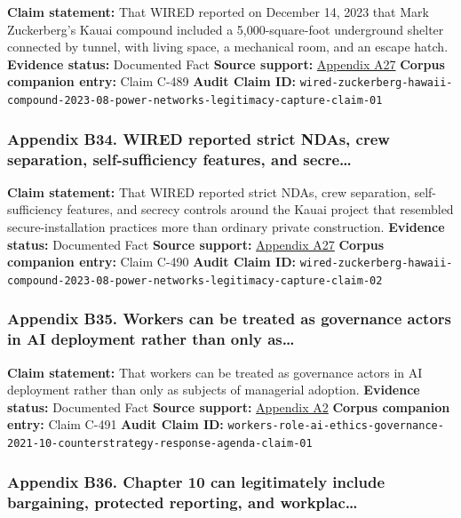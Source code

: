 \documentclass[
  american,
  11pt,
  letterpaper,
]{article}
\begin{document}
\textbf{Claim statement:} That WIRED reported on December 14, 2023 that
Mark Zuckerberg's Kauai compound included a 5,000-square-foot
underground shelter connected by tunnel, with living space, a mechanical
room, and an escape hatch. \textbf{Evidence status:} Documented Fact
\textbf{Source support:}
\hyperref[ch-10-appendix-a27-inside-mark-zuckerbergs-top-secret-hawaii-compound]{Appendix
A27} \textbf{Corpus companion entry:} Claim C-489 \textbf{Audit Claim
ID:}
\texttt{wired-zuckerberg-hawaii-compound-2023-08-power-networks-legitimacy-capture-claim-01}

\subsubsection{Appendix B34. WIRED reported strict NDAs, crew
separation, self-sufficiency features, and
secre\ldots{}}\label{ch-10-appendix-b34-wired-reported-strict-ndas-crew-separation-self-sufficiency-features-and-secre}

\textbf{Claim statement:} That WIRED reported strict NDAs, crew
separation, self-sufficiency features, and secrecy controls around the
Kauai project that resembled secure-installation practices more than
ordinary private construction. \textbf{Evidence status:} Documented Fact
\textbf{Source support:}
\hyperref[ch-10-appendix-a27-inside-mark-zuckerbergs-top-secret-hawaii-compound]{Appendix
A27} \textbf{Corpus companion entry:} Claim C-490 \textbf{Audit Claim
ID:}
\texttt{wired-zuckerberg-hawaii-compound-2023-08-power-networks-legitimacy-capture-claim-02}

\subsubsection{Appendix B35. Workers can be treated as governance actors
in AI deployment rather than only
as\ldots{}}\label{ch-10-appendix-b35-workers-can-be-treated-as-governance-actors-in-ai-deployment-rather-than-only-as}

\textbf{Claim statement:} That workers can be treated as governance
actors in AI deployment rather than only as subjects of managerial
adoption. \textbf{Evidence status:} Documented Fact \textbf{Source
support:}
\hyperref[ch-10-appendix-a2-in-oxford-handbook-on-ai-governance-the-role-of-workers-in-ai-ethics-and-governance]{Appendix
A2} \textbf{Corpus companion entry:} Claim C-491 \textbf{Audit Claim
ID:}
\texttt{workers-role-ai-ethics-governance-2021-10-counterstrategy-response-agenda-claim-01}

\subsubsection{Appendix B36. Chapter 10 can legitimately include
bargaining, protected reporting, and
workplac\ldots{}}\label{ch-10-appendix-b36-chapter-10-can-legitimately-include-bargaining-protected-reporting-and-workplac}
\end{document}
